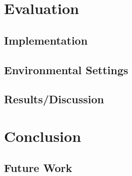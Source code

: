 \documentclass[cic,tc,english]{iiufrgs}
\begin{document}
\chapter{Evaluation}
    \label{evaluation}
    \section{Implementation}

    \section{Environmental Settings}

    \section{Results/Discussion}


\chapter{Conclusion}
    \section{Future Work}




\end{document}
